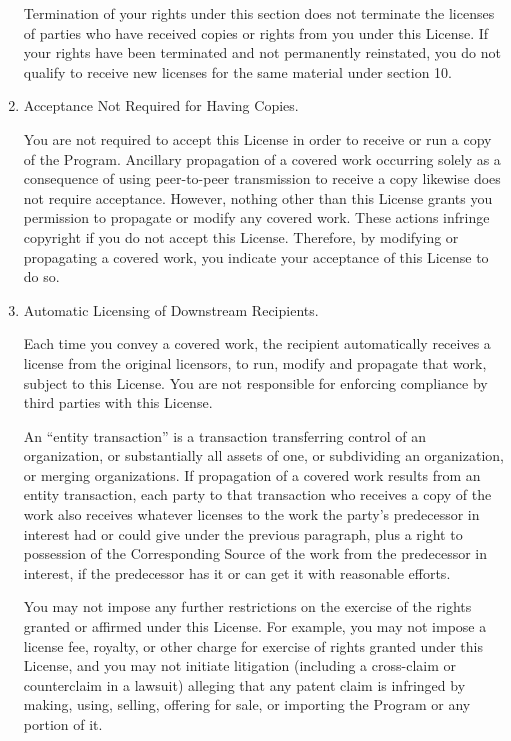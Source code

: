 \documentclass[11pt]{article}
\begin{document}
\begin{enumerate}
        Termination of your rights under this section does not terminate the
        licenses of parties who have received copies or rights from you under
        this License.  If your rights have been terminated and not permanently
        reinstated, you do not qualify to receive new licenses for the same
        material under section 10.

  \item Acceptance Not Required for Having Copies.

        You are not required to accept this License in order to receive or
        run a copy of the Program.  Ancillary propagation of a covered work
        occurring solely as a consequence of using peer-to-peer transmission
        to receive a copy likewise does not require acceptance.  However,
        nothing other than this License grants you permission to propagate or
        modify any covered work.  These actions infringe copyright if you do
        not accept this License.  Therefore, by modifying or propagating a
        covered work, you indicate your acceptance of this License to do so.

  \item Automatic Licensing of Downstream Recipients.

        Each time you convey a covered work, the recipient automatically
        receives a license from the original licensors, to run, modify and
        propagate that work, subject to this License.  You are not responsible
        for enforcing compliance by third parties with this License.

        An ``entity transaction'' is a transaction transferring control of an
        organization, or substantially all assets of one, or subdividing an
        organization, or merging organizations.  If propagation of a covered
        work results from an entity transaction, each party to that
        transaction who receives a copy of the work also receives whatever
        licenses to the work the party's predecessor in interest had or could
        give under the previous paragraph, plus a right to possession of the
        Corresponding Source of the work from the predecessor in interest, if
        the predecessor has it or can get it with reasonable efforts.

        You may not impose any further restrictions on the exercise of the
        rights granted or affirmed under this License.  For example, you may
        not impose a license fee, royalty, or other charge for exercise of
        rights granted under this License, and you may not initiate litigation
        (including a cross-claim or counterclaim in a lawsuit) alleging that
        any patent claim is infringed by making, using, selling, offering for
        sale, or importing the Program or any portion of it.


\end{enumerate}
\end{document}
